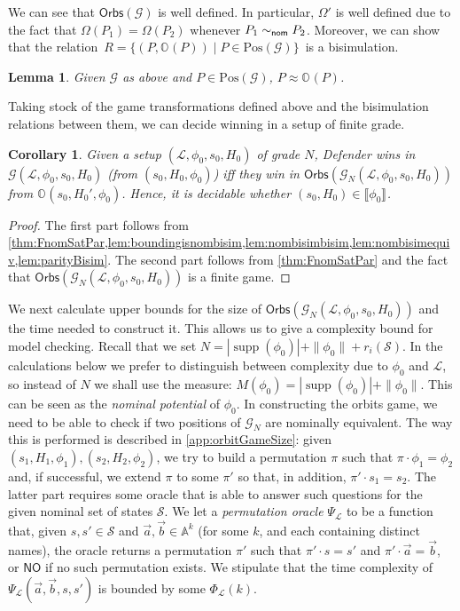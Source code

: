 \documentclass[10pt,a4paper]{article}
\newtheorem{lemma}[theorem]{Lemma}
\newtheorem{corollary}[theorem]{Corollary}
\theoremstyle{definition}
\theoremstyle{remark}
\newcommand\bisim{\approx}
\newcommand\nomeq[0]{\sim_{\sf nom}}
\newcommand\pos[0]{\mathrm{Pos}}
\newcommand\regindex[0]{r_i}
\DeclareMathOperator{\supp}{supp}
\newcommand\sem[2][\xi]{\llbracket#2\rrbracket_{#1}}
\newcommand\Gcal{\mathcal{G}}
\newcommand\Lcal{\mathcal{L}}
\newcommand\Scal{\mathcal{S}}
\newcommand\Atoms{\mathbb{A}}
\newcommand\orbs[1][]{\mathbb{O}_{#1}}
\newcommand\gorb[0]{{\mathsf{Orbs}}}
\newcommand\NO[0]{\mathsf{NO}}
\begin{document}
We can see that $\gorb(\Gcal)$ is well defined. In particular, $\Omega'$ is well defined due to the fact that $\Omega(P_1)=\Omega(P_2)$ whenever $P_1\nomeq P_2$.  
Moreover, we can show that the relation\ $R
=        \{(P, \orbs(P)) \mid P \in \pos(\Gcal)\}$\ is a bisimulation.


\begin{lemma}\label{lem:parityBisim}
  Given $\Gcal$ as above and $P\in\pos(\Gcal)$, $P\bisim\orbs(P)$.
\end{lemma}

Taking stock of the game transformations defined above and the bisimulation relations between them, we can decide winning in a setup of finite grade.

\begin{corollary}\label{cor:winningNom}
Given a setup $(\Lcal,\phi_0,s_0,H_0)$ of grade $N$, Defender wins in $\Gcal(\Lcal,\phi_0,s_0,H_0)$ (from $(s_0,H_0,\phi_0)$) iff they win in $\gorb(\Gcal_N(\Lcal,\phi_0,s_0,H_0))$ from $\orbs(s_0,H_0',\phi_0)$. Hence, it is decidable whether $(s_0,H_0)\in\sem[]{\phi_0}$.
\end{corollary}
\begin{proof}
The first part follows from \cref{thm:FnomSatPar,lem:boundingisnombisim,lem:nombisimbisim,lem:nombisimequiv,lem:parityBisim}. The second part follows from \cref{thm:FnomSatPar} and the fact that 
$\gorb(\Gcal_N(\Lcal,\phi_0,s_0,H_0))$ is a finite game.
\end{proof}

We next calculate upper bounds for the size of $\gorb(\Gcal_N(\Lcal,\phi_0,s_0,H_0))$ and the time needed to construct it. This allows us to give a complexity bound for model checking.
Recall that we set $N=|\supp(\phi_0)|+\|\phi_0\|+\regindex(\Scal)$. In the calculations below we prefer to distinguish between complexity due to $\phi_0$ and $\Lcal$, so instead of $N$ we shall use the measure: $M(\phi_0)=|\supp(\phi_0)|+\|\phi_0\|$. This can be seen as the \emph{nominal potential} of $\phi_0$.
In constructing the orbits game, we need to be able to check if two positions of $\Gcal_N$ are nominally equivalent. The way this is performed is described in \cref{app:orbitGameSize}: given $(s_1,H_1,\phi_1),(s_2,H_2,\phi_2)$, we try to build a permutation $\pi$ such that $\pi\cdot\phi_1=\phi_2$ and, if successful, we extend $\pi$ to some $\pi'$ so that, in addition, $\pi'\cdot s_1=s_2$. The latter part requires some oracle that is able to answer such questions for the given nominal set of states $\Scal$.
We let a \emph{permutation oracle} $\Psi_\Lcal$ to be a function that,
given  $s, s' \in \Scal$
	 and  $\vec a, \vec b \in \Atoms^k$ (for some $k$, and each containing distinct names), the oracle returns 
	a permutation $\pi'$ such that $\pi' \cdot s =s'$ and $\pi'\cdot \vec a = \vec b$,
	or $\NO$ if no such permutation exists. 
	We stipulate that the time complexity of $\Psi_\Lcal(\vec a, \vec b, s, s')$ is bounded by some $\Phi_\Lcal(k)$.
\end{document}
